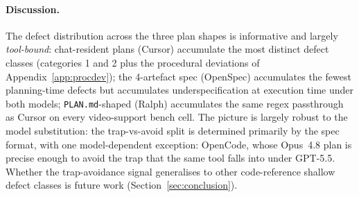 \paragraph{Discussion.}
The defect distribution across the three plan shapes is informative
and largely \emph{tool-bound}: chat-resident plans (Cursor)
accumulate the most distinct defect classes (categories 1 and 2 plus
the procedural deviations of Appendix~\ref{app:procdev}); the
4-artefact spec (OpenSpec) accumulates the fewest planning-time
defects but accumulates underspecification at execution time under
both models; \texttt{PLAN.md}-shaped (Ralph) accumulates the same
regex passthrough as Cursor on every video-support bench cell. The picture
is largely robust to the model substitution: the trap-vs-avoid split
is determined primarily by the spec format, with one model-dependent
exception: OpenCode, whose Opus~4.8 plan is precise enough to avoid
the trap that the same tool falls into under GPT-5.5. Whether the
trap-avoidance signal generalises to other code-reference shallow
defect classes is future work (Section~\ref{sec:conclusion}).
